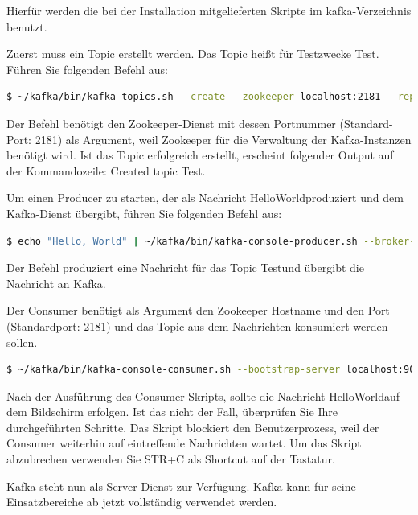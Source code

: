 \documentclass[a4paper,titlepage,halfparskip,12pt]{scrreprt}
\begin{document}
\begin{onehalfspacing}
Hierfür werden die bei der Installation mitgelieferten Skripte im \glqq kafka\grqq -Verzeichnis benutzt.

Zuerst muss ein Topic erstellt werden. Das Topic heißt für Testzwecke \glqq Test\grqq.  Führen Sie folgenden Befehl aus:

\smallskip

\begin{lstlisting}[language=Bash]
$ ~/kafka/bin/kafka-topics.sh --create --zookeeper localhost:2181 --replication-factor 1 --partitions 1 --topic Test
\end{lstlisting}

Der Befehl benötigt den Zookeeper-Dienst mit dessen Portnummer (Standard-Port: 2181) als Argument, weil Zookeeper für die Verwaltung der Kafka-Instanzen benötigt wird. Ist das Topic erfolgreich erstellt, erscheint folgender Output auf der Kommandozeile: \glqq Created topic Test\grqq.

Um einen Producer zu starten, der als Nachricht \glqq HelloWorld\grqq produziert und dem Kafka-Dienst übergibt, führen Sie folgenden Befehl aus:

\smallskip

\begin{lstlisting}[language=Bash]
$ echo "Hello, World" | ~/kafka/bin/kafka-console-producer.sh --broker-list localhost:9092 --topic Test > /dev/null
\end{lstlisting}

Der Befehl produziert eine Nachricht für das Topic \glqq Test\grqq und übergibt die Nachricht an Kafka.

Der Consumer benötigt als Argument den Zookeeper Hostname und den Port (Standardport: 2181) und das Topic aus dem Nachrichten konsumiert werden sollen.

\smallskip

\begin{lstlisting}[language=Bash]
$ ~/kafka/bin/kafka-console-consumer.sh --bootstrap-server localhost:9092 --topic Test --from-beginning
\end{lstlisting}

Nach der Ausführung des Consumer-Skripts, sollte die Nachricht \glqq HelloWorld\grqq auf dem Bildschirm erfolgen. Ist das nicht der Fall, überprüfen Sie Ihre durchgeführten Schritte. Das Skript blockiert den Benutzerprozess, weil der Consumer weiterhin auf eintreffende Nachrichten wartet. Um das Skript abzubrechen verwenden Sie STR+C als Shortcut auf der Tastatur.

Kafka steht nun als Server-Dienst zur Verfügung. Kafka kann für seine Einsatzbereiche ab jetzt vollständig verwendet werden.


\end{onehalfspacing}
\end{document}
